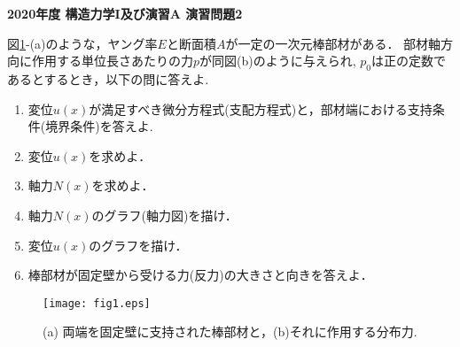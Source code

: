 \documentclass[10pt,a4j]{jarticle}
\newlength{\minitwocolumn}
\begin{document}
\newcommand{\fat}[1]{\mbox{\boldmath $#1$}}
\newcommand{\D}{\partial}
\newcommand{\w}{\omega}
\newcommand{\ga}{\alpha}
\newcommand{\gb}{\beta}
\newcommand{\gx}{\xi}
\newcommand{\gz}{\zeta}
\newcommand{\vhat}[1]{\hat{\fat{#1}}}
\newcommand{\spc}{\vspace{0.7\baselineskip}}
\newcommand{\halfspc}{\vspace{0.3\baselineskip}}

\pagestyle{empty}
\newcommand{\twofig}[2]
 {
   \begin{figure}
     \begin{minipage}[t]{\minitwocolumn}
         \begin{center}   #1
         \end{center}
     \end{minipage}
         \hspace{\columnsep}
     \begin{minipage}[t]{\minitwocolumn}
         \begin{center} #2
         \end{center}
     \end{minipage}
   \end{figure}
 }
\begin{center}
	{\Large \bf 2020年度 構造力学I及び演習A 演習問題2 } \\
\end{center}
\vspace{15mm}
図\ref{fig:fig1}-(a)のような，ヤング率$E$と断面積$A$が一定の一次元棒部材がある．
部材軸方向に作用する単位長さあたりの力$p$が同図(b)のように与えられ,
$p_0$は正の定数であるとするとき，以下の問に答えよ.
\begin{enumerate}
\item
	変位$u(x)$が満足すべき微分方程式(支配方程式)と，部材端における支持条件(境界条件)を答えよ. 
\item
	変位$u(x)$を求めよ．
\item
	軸力$N(x)$を求めよ．
\item
	軸力$N(x)$のグラフ(軸力図)を描け．
\item
	変位$u(x)$のグラフを描け．
\item
	棒部材が固定壁から受ける力(反力)の大きさと向きを答えよ．
\end{enumerate}
\begin{figure}[h]
	\vspace{-3mm}
	\begin{center}
	\texttt{[image: fig1.eps]} 
	\end{center}
	\vspace{-5mm}
	\caption{(a) 両端を固定壁に支持された棒部材と，(b)それに作用する分布力.} 
	\label{fig:fig1}
\end{figure}
\end{document}
